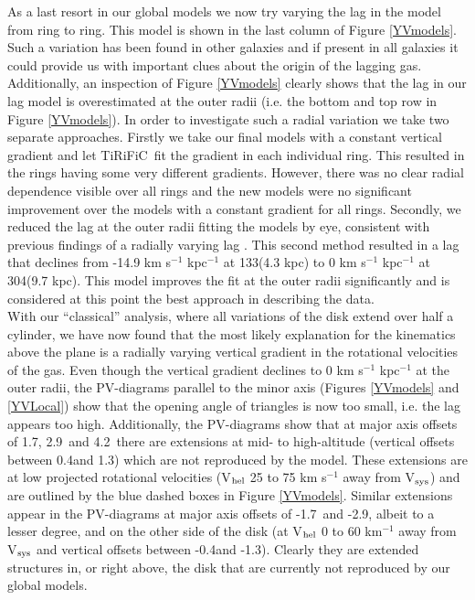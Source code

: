 \documentclass[useAMS,usenatbib]{mn2e}
\newcommand\tiri{{\sc TiRiFiC}}
\begin{document}
\indent  As a last resort in our global models we now try varying the lag in the model from ring to ring. This model is shown in the last column of Figure \ref{YVmodels}. Such a variation has been found in  other galaxies \citep{Oosterloo2007,Zschaechner2011,Zschaechner2012} and if present in all galaxies it could provide us with important clues about the origin of the lagging gas. Additionally, an inspection of Figure \ref{YVmodels} clearly shows that  the lag in our lag model is overestimated at the outer radii (i.e. the bottom and top row in Figure \ref{YVmodels}). In order to investigate such a radial variation we take two separate approaches. Firstly we take our final models with a constant vertical gradient and let \tiri\ fit the gradient in each individual ring. This resulted in the rings having some very different gradients. However, there was no clear radial dependence visible over all rings and the new models were no significant improvement over the models with a constant gradient for all rings. Secondly, we reduced the lag at the outer radii fitting the models by eye, consistent with previous findings of a radially varying lag \citep{Zschaechner2011,Zschaechner2012}. This second method resulted in a lag that declines from -14.9 km s$^{-1}$ kpc$^{-1}$ at 133\arcsec (4.3 kpc) to 0 km s$^{-1}$ kpc$^{-1}$ at 304\arcsec (9.7 kpc). This model improves the fit at the outer radii significantly and is considered at this point the best approach in describing the data. \\
\indent With our ``classical'' analysis, where all variations of the disk extend over half a cylinder, we have now found that the most likely explanation for the kinematics above the plane is a radially varying vertical gradient in the rotational velocities of the gas. Even though the vertical gradient declines to 0  km s$^{-1}$ kpc$^{-1}$ at the outer radii, the PV-diagrams parallel to the minor axis (Figures \ref{YVmodels} and \ref{YVLocal}) show that the opening angle of triangles is now too small, i.e. the lag appears too high. Additionally, the PV-diagrams show that at major axis offsets of 1.7\arcmin, 2.9\arcmin\ and 4.2\arcmin\ there are extensions at mid- to high-altitude (vertical offsets between 0.4\arcmin and 1.3\arcmin) which are not reproduced by the model. These extensions are at low projected rotational velocities (V$_{\rm hel}$ 25 to 75 km s$^{-1}$ away from V$_{\rm sys}$) and are outlined by the blue dashed boxes in Figure \ref{YVmodels}. Similar extensions appear in the PV-diagrams at major axis offsets of -1.7\arcmin\ and -2.9\arcmin, albeit to a lesser degree, and on the other side of the disk (at V$_{\rm hel}$ 0  to  60 km$^{-1}$ away from V$_{\rm sys}$ and vertical offsets between  -0.4\arcmin and -1.3\arcmin).  Clearly they are extended structures in, or right above, the disk that are currently not reproduced by our global models. \\
\end{document}
